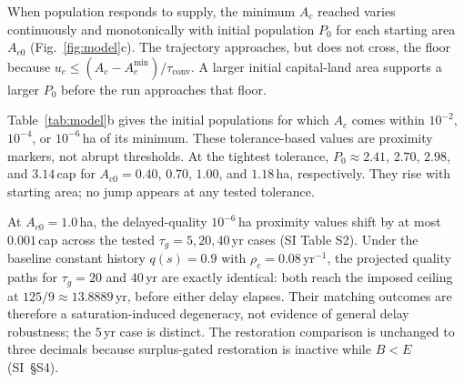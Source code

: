 \documentclass[preprint,12pt,authoryear]{elsarticle}
\newcommand{\Acmin}{A_c^{\min}}
\newcommand{\tconv}{\tau_{\mathrm{conv}}}
\begin{document}
When population responds to supply, the minimum $A_c$ reached varies continuously and monotonically with initial population $P_0$ for each starting area $A_{c0}$ (Fig.~\ref{fig:model}c). The trajectory approaches, but does not cross, the floor because $u_c\le(A_c-\Acmin)/\tconv$. A larger initial capital-land area supports a larger $P_0$ before the run approaches that floor.

Table~\ref{tab:model}b gives the initial populations for which $A_c$ comes within $10^{-2}$, $10^{-4}$, or $10^{-6}$\,ha of its minimum. These tolerance-based values are proximity markers, not abrupt thresholds. At the tightest tolerance, $P_0\approx2.41$, $2.70$, $2.98$, and $3.14$\,cap for $A_{c0}=0.40$, $0.70$, $1.00$, and $1.18$\,ha, respectively. They rise with starting area; no jump appears at any tested tolerance.

At $A_{c0}=1.0$\,ha, the delayed-quality $10^{-6}$\,ha proximity values shift by at most $0.001$\,cap across the tested $\tau_g=5,20,40$\,yr cases (SI Table S2). Under the baseline constant history $q(s)=0.9$ with $\rho_c=0.08$\,yr$^{-1}$, the projected quality paths for $\tau_g=20$ and $40$\,yr are exactly identical: both reach the imposed ceiling at $125/9\approx13.8889$\,yr, before either delay elapses. Their matching outcomes are therefore a saturation-induced degeneracy, not evidence of general delay robustness; the $5$\,yr case is distinct. The restoration comparison is unchanged to three decimals because surplus-gated restoration is inactive while $B<E$ (SI~\S S4).
\end{document}
